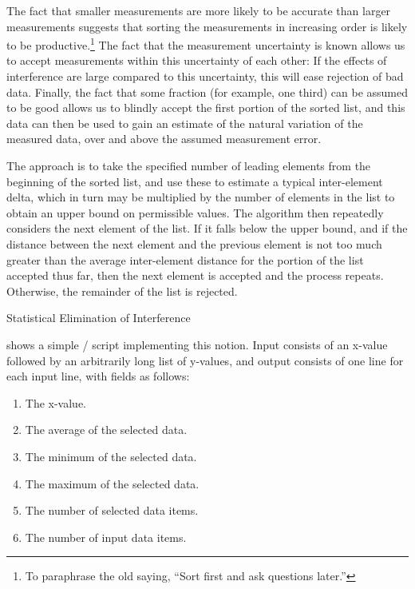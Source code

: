 The fact that smaller measurements are more likely to be accurate than
larger measurements suggests that sorting the measurements in increasing
order is likely to be productive.\footnote{
	To paraphrase the old saying, ``Sort first and ask questions later.''}
The fact that the measurement uncertainty is known allows us to accept
measurements within this uncertainty of each other:  If the effects of
interference are large compared to this uncertainty, this will ease
rejection of bad data.
Finally, the fact that some fraction (for example, one third) can be
assumed to be good allows us to blindly accept the first portion of the
sorted list, and this data can then be used to gain an estimate of the
natural variation of the measured data, over and above the assumed
measurement error.

The approach is to take the specified number of leading elements from the
beginning of the sorted list, and use these to estimate a typical
inter-element delta, which in turn may be multiplied by the number of
elements in the list to obtain an upper bound on permissible values.
The algorithm then repeatedly considers the next element of the list.
If it falls below the upper bound, and if the distance between
the next element and the previous element is not too much greater than
the average inter-element distance for the portion of the list accepted
thus far, then the next element is accepted and the process repeats.
Otherwise, the remainder of the list is rejected.

\begin{listing}

\caption{Statistical Elimination of Interference}
\label{lst:debugging:Statistical Elimination of Interference}
\end{listing}

shows a simple / script implementing this notion.
Input consists of an x-value followed by an arbitrarily long list of y-values,
and output consists of one line for each input line, with fields as follows:

\begin{enumerate}
\item	The x-value.
\item	The average of the selected data.
\item	The minimum of the selected data.
\item	The maximum of the selected data.
\item	The number of selected data items.
\item	The number of input data items.
\end{enumerate}

